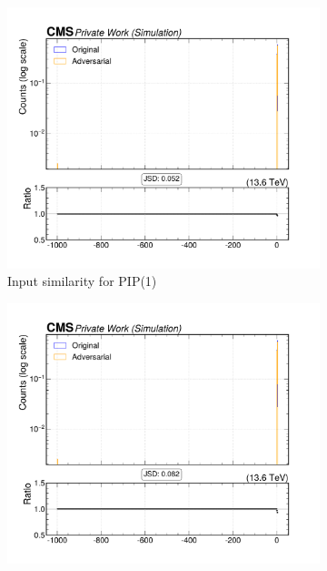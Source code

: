 \begin{figure}[htbp]
  \centering
  \begin{subfigure}[t]{0.32\textwidth}
    \includegraphics[width=\linewidth]{media/output/features/compare/intprob_1/cmp_global_features_TagVarCSV_vertexCategory.pdf}
    \caption{Input similarity for PIP(1)}
  \end{subfigure}\hfill
  \begin{subfigure}[t]{0.32\textwidth}
    \includegraphics[width=\linewidth]{media/output/features/compare/intprob_2/cmp_global_features_TagVarCSV_vertexCategory.pdf}

\end{subfigure}
\end{figure}
